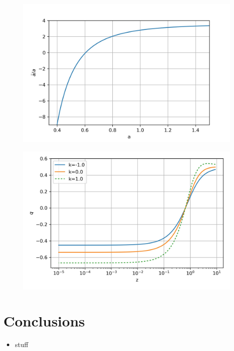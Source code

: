 \documentclass{beamer}
\begin{document}
{\begin{frame}
\begin{figure}[ht]
    \begin{minipage}{0.49\linewidth}
        \centering
        \includegraphics[width=\textwidth]{./Images/UDF_addot.jpg}
		\label{fig:ch_ddot}
    \end{minipage}
    \begin{minipage}{0.49\linewidth}
        \centering
        \includegraphics[width=\textwidth]{./Images/UDF_q.jpg}
		\label{fig:Chq}
    \end{minipage}
\end{figure}
\end{frame}

\section{Conclusions}
\begin{frame}
\begin{itemize}
\frametitle{\insertsectionhead}

\item stuff
\end{itemize}
\end{frame}


\begin{frame}
                               
 
\end{frame}
}
\end{document}
